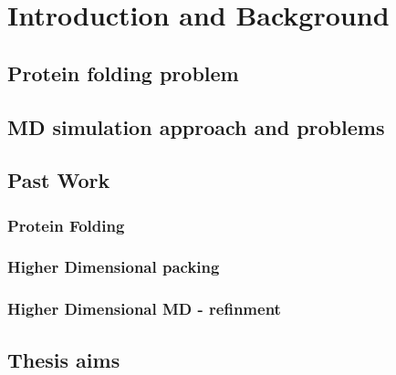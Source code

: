 \chapter{Introduction and Background}

\section{Protein folding problem}
\section{MD simulation approach and problems}
\section{Past Work}
\subsection{Protein Folding}
\subsection{Higher Dimensional packing}
\subsection{Higher Dimensional MD - refinment}
\section{Thesis aims}

\newpage

